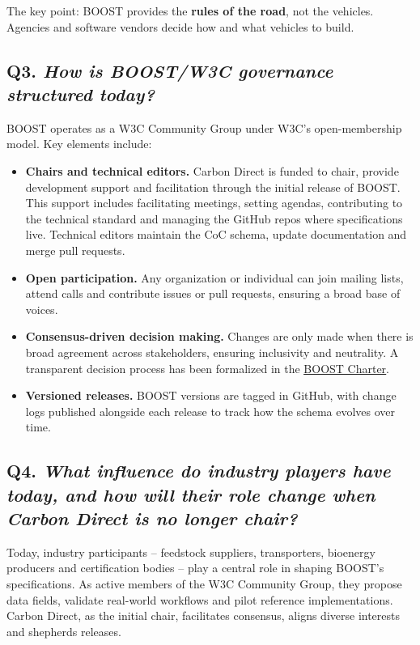 \documentclass[title=small,preset=opensansnote,par=skip]{article}
\begin{document}
The key point: BOOST provides the \textbf{rules of the road}, not the vehicles. Agencies and software vendors decide how and what vehicles to build.
\subsection{Q3. \emph{How is BOOST/W3C governance structured today?}}
\label{sec:org0d91105}

BOOST operates as a W3C Community Group under W3C's open-membership model. Key elements include:

\begin{itemize}
\item \textbf{Chairs and technical editors.} Carbon Direct is funded to chair, provide development support and facilitation through the initial release of BOOST. This support includes facilitating meetings, setting agendas, contributing to the technical standard and managing the GitHub repos where specifications live. Technical editors maintain the CoC schema, update documentation and merge pull requests.

\item \textbf{Open participation.} Any organization or individual can join mailing lists, attend calls and contribute issues or pull requests, ensuring a broad base of voices.

\item \textbf{Consensus-driven decision making.} Changes are only made when there is broad agreement across stakeholders, ensuring inclusivity and neutrality. A transparent decision process has been formalized in the \href{https://github.com/carbondirect/BOOST/blob/main/BOOST\_Charter.org\#decision-process}{\uline{BOOST Charter}}.

\item \textbf{Versioned releases.} BOOST versions are tagged in GitHub, with change logs published alongside each release to track how the schema evolves over time.
\end{itemize}
\subsection{Q4. \emph{What influence do industry players have today, and how will their role change when Carbon Direct is no longer chair?}}
\label{sec:org447e365}

Today, industry participants -- feedstock suppliers, transporters, bioenergy producers and certification bodies -- play a central role in shaping BOOST's specifications. As active members of the W3C Community Group, they propose data fields, validate real-world workflows and pilot reference implementations. Carbon Direct, as the initial chair, facilitates consensus, aligns diverse interests and shepherds releases.
\end{document}
